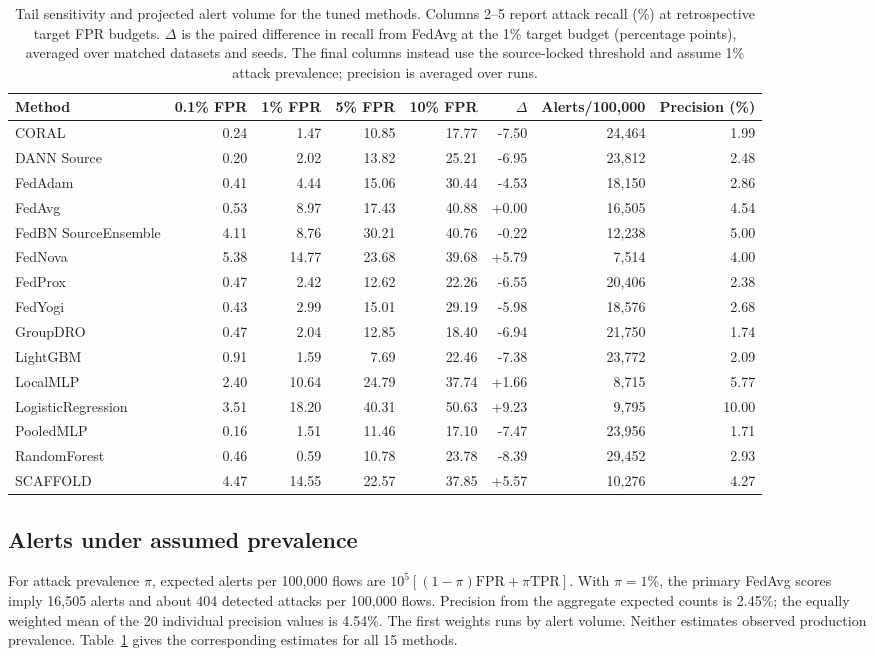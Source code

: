 \documentclass[journal,10pt]{IEEEtran}
\begin{document}
\begin{table}[t]\centering\small
\caption{Tail sensitivity and projected alert volume for the tuned methods. Columns 2--5 report attack recall (\%) at retrospective target FPR budgets. $\Delta$ is the paired difference in recall from FedAvg at the 1\% target budget (percentage points), averaged over matched datasets and seeds. The final columns instead use the source-locked threshold and assume 1\% attack prevalence; precision is averaged over runs.}\label{tab:budgetsfull}
\begin{tabular}{lrrrrrrr}\toprule
Method & 0.1\% FPR & 1\% FPR & 5\% FPR & 10\% FPR & $\Delta$ & Alerts/100,000 & Precision (\%)\\\midrule
CORAL & 0.24 & 1.47 & 10.85 & 17.77 & -7.50 & 24,464 & 1.99\\
DANN Source & 0.20 & 2.02 & 13.82 & 25.21 & -6.95 & 23,812 & 2.48\\
FedAdam & 0.41 & 4.44 & 15.06 & 30.44 & -4.53 & 18,150 & 2.86\\
FedAvg & 0.53 & 8.97 & 17.43 & 40.88 & +0.00 & 16,505 & 4.54\\
FedBN SourceEnsemble & 4.11 & 8.76 & 30.21 & 40.76 & -0.22 & 12,238 & 5.00\\
FedNova & 5.38 & 14.77 & 23.68 & 39.68 & +5.79 & 7,514 & 4.00\\
FedProx & 0.47 & 2.42 & 12.62 & 22.26 & -6.55 & 20,406 & 2.38\\
FedYogi & 0.43 & 2.99 & 15.01 & 29.19 & -5.98 & 18,576 & 2.68\\
GroupDRO & 0.47 & 2.04 & 12.85 & 18.40 & -6.94 & 21,750 & 1.74\\
LightGBM & 0.91 & 1.59 & 7.69 & 22.46 & -7.38 & 23,772 & 2.09\\
LocalMLP & 2.40 & 10.64 & 24.79 & 37.74 & +1.66 & 8,715 & 5.77\\
LogisticRegression & 3.51 & 18.20 & 40.31 & 50.63 & +9.23 & 9,795 & 10.00\\
PooledMLP & 0.16 & 1.51 & 11.46 & 17.10 & -7.47 & 23,956 & 1.71\\
RandomForest & 0.46 & 0.59 & 10.78 & 23.78 & -8.39 & 29,452 & 2.93\\
SCAFFOLD & 4.47 & 14.55 & 22.57 & 37.85 & +5.57 & 10,276 & 4.27\\
\bottomrule\end{tabular}\end{table}
\subsection{Alerts under assumed prevalence}
For attack prevalence $\pi$, expected alerts per 100,000 flows are $10^5[(1-\pi)\mathrm{FPR}+\pi\mathrm{TPR}]$. With $\pi=1\%$, the primary FedAvg scores imply 16,505 alerts and about 404 detected attacks per 100,000 flows. Precision from the aggregate expected counts is 2.45\%; the equally weighted mean of the 20 individual precision values is 4.54\%. The first weights runs by alert volume. Neither estimates observed production prevalence. Table~\ref{tab:budgetsfull} gives the corresponding estimates for all 15 methods.
\end{document}
